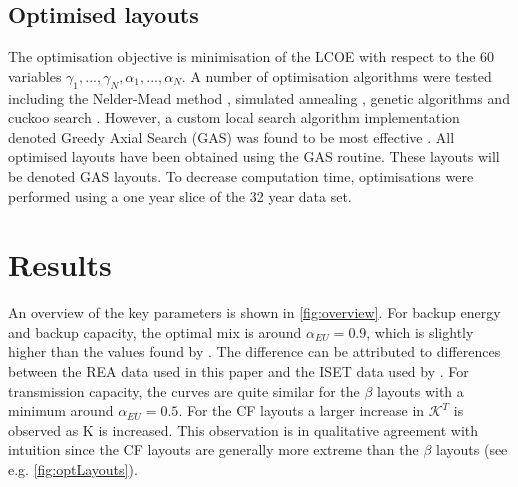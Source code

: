 \documentclass[a4paper, 5p, sort&compress]{elsarticle}%
\begin{document}
\subsection{Optimised layouts}
\label{sec:optimized-layouts}

The optimisation objective is minimisation of the LCOE with respect to
the 60 variables
$\gamma_{1}, ..., \gamma_{N}, \alpha_{1}, ..., \alpha_{N}$.  A number of optimisation
algorithms were tested including the Nelder-Mead method \cite{nelder},
simulated annealing \cite{sa}, genetic algorithms \cite{ga} and cuckoo
search \cite{cs}. However, a custom local search algorithm
implementation denoted Greedy Axial Search (GAS) %
was found to be most effective \cite{emil}. All optimised layouts have
been obtained using the GAS routine. These layouts will be denoted GAS
layouts. To decrease computation time, optimisations were performed
using a one year slice of the 32 year data set.


\section{Results}
\label{sec:results}

An overview of the key parameters is shown in \cref{fig:overview}. For
backup energy and backup capacity, the optimal mix is around
$\alpha_{EU} = 0.9$, which is slightly higher than the values found by
\cite{Heide2010,Heide2011}.
The difference can be attributed to differences between the REA data
used in this paper and the ISET data \cite{iset} used by
\cite{Heide2010,Heide2011}. For transmission capacity, the curves are
quite similar for the $\beta$ layouts with a minimum around
$\alpha_{EU} = 0.5$. For the CF layouts a larger increase in
$\mathcal{K}^{T}$ is observed as K is increased. This observation is
in qualitative agreement with intuition since the CF layouts are
generally more extreme than the $\beta$ layouts (see
e.g. \cref{fig:optLayouts}).

\end{document}
